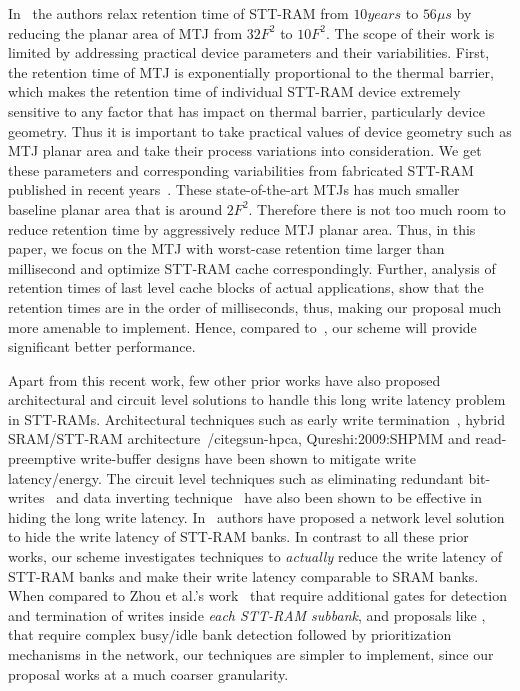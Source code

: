 


In~\cite{STTRAM:HPCA11} the authors relax retention time of STT-RAM from $10 years$ to $56 \mu s$ by
reducing the planar area of MTJ from $32F^2$ to $10F^2$. The scope of their work is limited by
addressing practical device parameters and their variabilities. First, the retention time of MTJ is
exponentially proportional to the thermal barrier, which makes the retention time of individual
STT-RAM device extremely sensitive to any factor that has impact on thermal barrier, particularly
device geometry. Thus it is important to take practical values of device geometry such as MTJ planar
area and take their process variations into consideration. We get these parameters and corresponding
variabilities from fabricated STT-RAM published in recent
years~\cite{PMTJ:Toshiba08,STTRAM:EDL11,STTRAM:Qualcomm09,STTRAM:Grandis11}. These state-of-the-art
MTJs has much smaller baseline planar area that is around $2F^2$. Therefore there is not too much
room to reduce retention time by aggressively reduce MTJ planar area. Thus, in this paper, we focus
on the MTJ with worst-case retention time larger than millisecond and optimize STT-RAM cache
correspondingly. Further, analysis of retention times of last level cache blocks of actual
applications, show that the retention times are in the order of milliseconds, thus, making our
proposal much more amenable to implement. Hence, compared to~\cite{STTRAM:HPCA11}, our scheme will
provide significant better performance.

Apart from this recent work, few other prior works have also proposed architectural and circuit level
solutions to handle this long write latency problem in STT-RAMs. Architectural techniques such as
early write termination~\cite{mram-energy-reduction}, hybrid SRAM/STT-RAM
architecture~/cite{gsun-hpca, Qureshi:2009:SHPMM} and read-preemptive write-buffer designs have been
shown to mitigate write latency/energy. The circuit level techniques such as eliminating redundant
bit-writes~\cite{mram-energy-reducton} and data inverting technique~\cite{gsun-hpca} have also been
shown to be effective in hiding the long write latency. In~\cite{mram-noc} authors have proposed a
network level solution to hide the write latency of STT-RAM banks.  In contrast to all these prior
works, our scheme investigates techniques to {\it actually} reduce the write latency of STT-RAM banks
and make their write latency comparable to SRAM banks. When compared to Zhou et al.'s
work~\cite{mram-energy-reduction} that require additional gates for detection and termination of
writes inside {\it each STT-RAM subbank}, and proposals like \cite{mram-noc}, that require complex
busy/idle bank detection followed by prioritization mechanisms in the network, our techniques are
simpler to implement, since our proposal works at a much coarser granularity.

